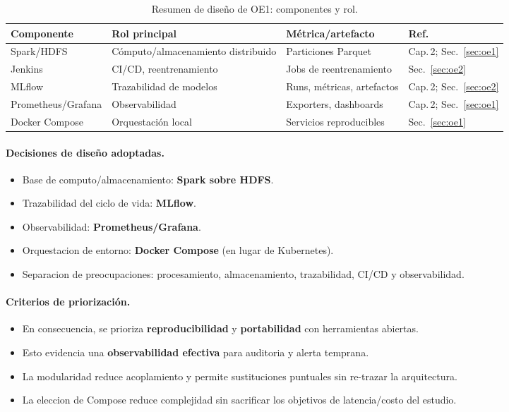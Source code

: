 \begin{table}[htbp]
\centering
\caption{Resumen de diseño de OE1: componentes y rol.}
\label{tab:oe1-diseno}
\small
\begin{tabularx}{\textwidth}{l >{\raggedright\arraybackslash}X >{\raggedright\arraybackslash}X l}
\toprule
\textbf{Componente} & \textbf{Rol principal} & \textbf{Métrica/artefacto} & \textbf{Ref.} \\
\midrule
Spark/HDFS          & Cómputo/almacenamiento distribuido & Particiones Parquet            & Cap.\,2; Sec.~\ref{sec:oe1} \\
Jenkins             & CI/CD, reentrenamiento              & Jobs de reentrenamiento        & Sec.~\ref{sec:oe2}          \\
MLflow              & Trazabilidad de modelos             & Runs, métricas, artefactos     & Cap.\,2; Sec.~\ref{sec:oe2} \\
Prometheus/Grafana  & Observabilidad                      & Exporters, dashboards          & Cap.\,2; Sec.~\ref{sec:oe1} \\
Docker Compose      & Orquestación local                  & Servicios reproducibles        & Sec.~\ref{sec:oe1}          \\
\bottomrule
\end{tabularx}
\end{table}


\paragraph{Decisiones de diseño adoptadas.}
\begin{itemize}\setlength\itemsep{2pt}
  \item Base de computo/almacenamiento: \textbf{Spark sobre HDFS}.
  \item Trazabilidad del ciclo de vida: \textbf{MLflow}.
  \item Observabilidad: \textbf{Prometheus/Grafana}.
  \item Orquestacion de entorno: \textbf{Docker Compose} (en lugar de Kubernetes).
  \item Separacion de preocupaciones: procesamiento, almacenamiento, trazabilidad, CI/CD y observabilidad.
\end{itemize}

\paragraph{Criterios de priorización.}
\begin{itemize}\setlength\itemsep{2pt}
  \item En consecuencia, se prioriza \textbf{reproducibilidad} y \textbf{portabilidad} con herramientas abiertas.
  \item Esto evidencia una \textbf{observabilidad efectiva} para auditoria y alerta temprana.
  \item La modularidad reduce acoplamiento y permite sustituciones puntuales sin re-trazar la arquitectura.
  \item La eleccion de Compose reduce complejidad sin sacrificar los objetivos de latencia/costo del estudio.
\end{itemize}

